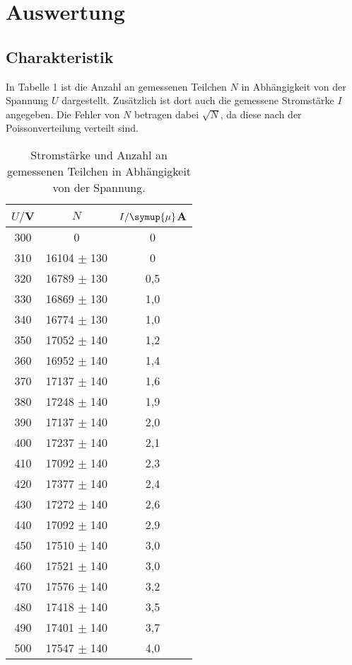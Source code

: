 \section{Auswertung}
\label{sec:Auswertung}

\subsection{Charakteristik}
In Tabelle 1 ist die Anzahl an gemessenen Teilchen $N$ in Abhängigkeit von der Spannung  $U$ dargestellt. Zusätzlich
ist dort auch die gemessene Stromstärke $I$ angegeben. Die Fehler von $N$ betragen dabei $\sqrt{N}$, da diese nach der
Poissonverteilung verteilt sind.

\begin{table}[H]
  \centering
  \caption{Stromstärke und Anzahl an gemessenen Teilchen in Abhängigkeit von der Spannung.}
  \label{tab:Rechteckspannung}
  \begin{tabular}{c c c}
    \toprule
    $U/$V & $N$ & $I/\symup{\mu}$A \\
    \midrule
    300 &	0	    & 0  \\
    310 &	16104 $\pm$ 130 &	0  \\
    320 &	16789 $\pm$ 130 &	0,5 \\
    330 &	16869 $\pm$ 130 &	1,0 \\
    340 &	16774 $\pm$ 130 &	1,0 \\
    350 &	17052 $\pm$ 140 &	1,2 \\
    360 &	16952 $\pm$ 140 &	1,4 \\
    370 &	17137 $\pm$ 140 &	1,6 \\
    380 &	17248 $\pm$ 140 &	1,9 \\
    390 &	17137 $\pm$ 140 &	2,0 \\
    400 &	17237 $\pm$ 140 &	2,1 \\
    410 &	17092 $\pm$ 140 &	2,3 \\
    420 &	17377 $\pm$ 140 &	2,4 \\
    430 &	17272 $\pm$ 140 &	2,6 \\
    440 &	17092 $\pm$ 140 &	2,9 \\
    450 &	17510 $\pm$ 140 &	3,0 \\
    460 &	17521 $\pm$ 140 &	3,0 \\
    470 &	17576 $\pm$ 140 &	3,2 \\
    480 &	17418 $\pm$ 140 &	3,5 \\
    490 &	17401 $\pm$ 140 &	3,7 \\
    500 &	17547 $\pm$ 140 &	4,0 \\

\end{tabular}
\end{table}
